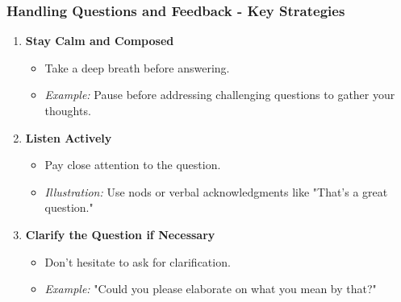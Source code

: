\documentclass[aspectratio=169]{beamer}
\begin{document}
\begin{frame}[fragile]
    \frametitle{Handling Questions and Feedback - Key Strategies}
    \begin{enumerate}
        \item \textbf{Stay Calm and Composed}
        \begin{itemize}
            \item Take a deep breath before answering.
            \item \textit{Example:} Pause before addressing challenging questions to gather your thoughts.
        \end{itemize}
        
        \item \textbf{Listen Actively}
        \begin{itemize}
            \item Pay close attention to the question.
            \item \textit{Illustration:} Use nods or verbal acknowledgments like "That's a great question."
        \end{itemize}
        
        \item \textbf{Clarify the Question if Necessary}
        \begin{itemize}
            \item Don't hesitate to ask for clarification.
            \item \textit{Example:} "Could you please elaborate on what you mean by that?"
        \end{itemize}
    \end{enumerate}
\end{frame}
\end{document}
